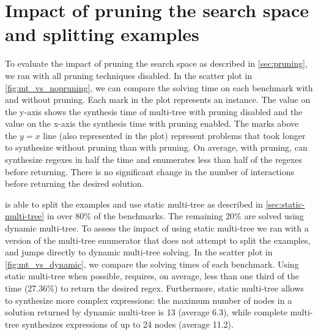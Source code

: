 

\section{Impact of pruning the search space and splitting examples}\label{sec:pruning-split}
%


To evaluate the impact of pruning the search space as described in \autoref{sec:pruning}, we ran \Forest{} with all pruning techniques disabled.
In the scatter plot in \autoref{fig:mt_vs_nopruning}, we can compare the solving time on each benchmark with and without pruning. Each mark in the plot represents an instance. The value on the y-axis shows the synthesis time of multi-tree with pruning disabled and the value on the x-axis the synthesis time with pruning enabled. The marks above the \(y = x\) line (also represented in the plot) represent problems that took longer to synthesize without pruning than with pruning.
On average, with pruning, \Forest{} can synthesize regexes in half the time and enumerates less than half of the regexes before returning. There is no significant change in the number of interactions before returning the desired solution.


\Forest{} is able to split the examples and use static multi-tree as described in \autoref{sec:static-multi-tree} in over 80\% of the benchmarks. The remaining 20\% are solved using dynamic multi-tree. To assess the impact of using static multi-tree we ran \Forest{} with a version of the multi-tree enumerator that does not attempt to split the examples, and jumps directly to dynamic multi-tree solving.
In the scatter plot in \autoref{fig:mt_vs_dynamic}, we compare the solving times of each benchmark. Using static multi-tree when possible, \Forest{} requires, on average, less than one third of the time (27.36\%) to return the desired regex. Furthermore, static multi-tree allows \Forest{} to synthesize more complex expressions: the maximum number of nodes in a solution returned by dynamic multi-tree is 13 (average 6.3), while complete multi-tree synthesizes expressions of up to 24 nodes (average 11.2).

